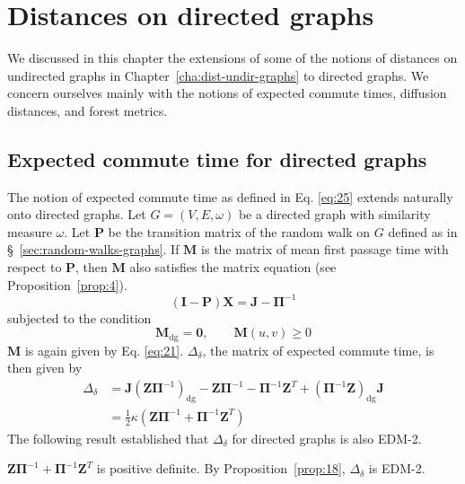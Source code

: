 \chapter{Distances on directed graphs}
\label{cha:dist-direct-graphs}
We discussed in this chapter the extensions of some of the notions of
distances on undirected graphs in Chapter~\ref{cha:dist-undir-graphs}
to directed graphs. We concern ourselves mainly with the notions of
expected commute times, diffusion distances, and forest metrics. 
\section{Expected commute time for directed graphs}
\label{sec:expect-comm-time-1}
The notion of expected commute time as defined in
Eq. \eqref{eq:25} extends naturally onto directed graphs. Let $G =
(V,E,\omega)$ be a directed graph with similarity measure
$\omega$. Let $\mathbf{P}$ be the transition matrix of the random walk
on $G$ defined as in \S~\ref{sec:random-walks-graphs}. 
If $\mathbf{M}$ is the matrix of mean first passage time with respect
to $\mathbf{P}$, then $\mathbf{M}$ also satisfies the matrix equation
(see Proposition~\ref{prop:4}). 
\begin{equation*}
   (\mathbf{I} - \mathbf{P})\mathbf{X} = \mathbf{J} - \bm{\Pi}^{-1}
\end{equation*}
subjected to the condition 
\begin{equation*}
 \mathbf{M}_{\mathrm{dg}} = \mathbf{0}, \qquad \mathbf{M}(u,v) \geq 0   
\end{equation*}
$\mathbf{M}$ is again given by
Eq. \eqref{eq:21}. $\Delta_{\delta}$, the matrix of expected commute
time, is then given by
\begin{equation}
  \label{eq:73}
  \begin{split}
    \Delta_\delta &= \mathbf{J}(\mathbf{Z}\bm{\Pi}^{-1})_{\mathrm{dg}}
    - \mathbf{Z}\bm{\Pi}^{-1} - \bm{\Pi}^{-1}\mathbf{Z}^{T} +
    (\bm{\Pi}^{-1}\mathbf{Z})_{\mathrm{dg}}\mathbf{J} \\ \ &=
    \tfrac{1}{2}\kappa(\mathbf{Z}\bm{\Pi}^{-1} +
    \mathbf{\Pi}^{-1}\mathbf{Z}^{T})
  \end{split}
\end{equation}
%
The following result established that $\Delta_{\delta}$ for directed
graphs is also EDM-2.
\begin{proposition}
  \label{prop:19}
 $\mathbf{Z}\bm{\Pi}^{-1} + \bm{\Pi}^{-1}\mathbf{Z}^{T}$ is
 positive definite. By Proposition~\ref{prop:18},
 $\Delta_{\delta}$ is EDM-2.  
\end{proposition}
